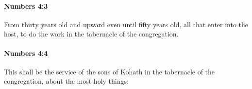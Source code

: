 		\paragraph{Numbers 4:3} %
			\label{NUMBERS-4-3}

			From thirty years old and upward even until fifty years old, all that enter into the host, to do the work in the tabernacle of the congregation.


		\paragraph{Numbers 4:4} %
			\label{NUMBERS-4-4}

			This shall be the service of the sons of Kohath in the tabernacle of the congregation, about the most holy things:


